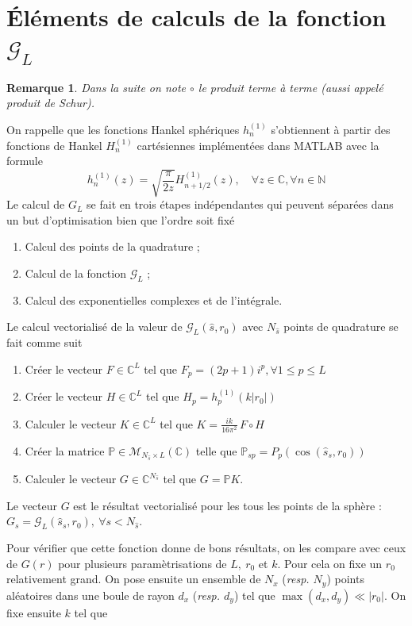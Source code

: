 \documentclass[11pt]{article}
\newtheorem{rmq}{Remarque}
\newcommand{\C}{\mathbb{C}}
\newcommand{\N}{\mathbb{N}}
\newcommand{\hs}{\hat{s}}
\newcommand{\lG}{\mathcal{G}}
\begin{document}
\section{Éléments de calculs de la fonction $\lG_L$}

\begin{rmq}
  Dans la suite on note $\circ$ le produit terme à terme (aussi appelé produit de Schur).
\end{rmq}

On rappelle que les fonctions Hankel sphériques $h^{(1)}_n$ s'obtiennent à partir des fonctions de Hankel $H^{(1)}_n$ cartésiennes
implémentées dans MATLAB avec la formule
\[
  h^{(1)}_n(z) = \sqrt{\frac{\pi}{2z}}H^{(1)}_{n+1/2}(z), \quad \forall z \in \C, \forall n \in \N
\]
Le calcul de $G_L$ se fait en trois étapes indépendantes qui peuvent séparées dans un but d'optimisation bien que l'ordre soit fixé
\begin{enumerate}
\item Calcul des points de la quadrature ;
\item Calcul de la fonction $\lG_L$ ;
\item Calcul des exponentielles complexes et de l'intégrale.
\end{enumerate}
Le calcul vectorialisé de la valeur de $\lG_L(\hs, r_0)$ avec $N_{\hs}$ points de quadrature se fait comme suit
\begin{enumerate}
\item Créer le vecteur $F\in\C^L$ tel que $F_p = (2p+1) i^p, \forall 1\leq p \leq L $ 
\item Créer le vecteur $H\in\C^L$ tel que $H_p = h^{(1)}_p(k|r_0|)$
\item Calculer le vecteur $K\in\C^L$ tel que $K = \frac{i k}{16 \pi^2}\,F \circ H$
\item Créer la matrice $\mathbb{P}\in\mathcal{M}_{N_{\hs}\times L}(\C)$ telle que $\mathbb{P}_{sp} = P_p(\cos(\hs_s, r_0))$
\item Calculer le vecteur $G\in\C^{N_{\hs}}$ tel que $G = \mathbb{P}K$.
\end{enumerate}
Le vecteur $G$ est le résultat vectorialisé pour les tous les points de la sphère : $G_s = \lG_L(\hs_s, r_0), ~ \forall s<N_{\hs}$.


Pour vérifier que cette fonction donne de bons résultats, on les compare avec ceux de $G(r)$ pour plusieurs paramètrisations de $L,~ r_0$
et $k$. Pour cela on fixe un $r_0$ relativement grand. On pose ensuite un ensemble de $N_x$ (\emph{resp. $N_y$}) points aléatoires dans une boule de rayon $d_x$
(\emph{resp. $d_y$}) tel que $\max(d_x, d_y) \ll |r_0|$. On fixe ensuite $k$ tel que
\end{document}
